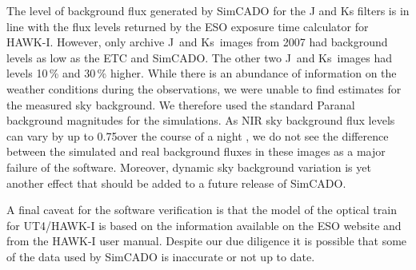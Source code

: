 The level of background flux generated by SimCADO for the J and Ks filters is in line with the flux levels returned by the ESO exposure time calculator for HAWK-I. However, only archive J~and Ks~images from 2007 had background levels as low as the ETC and SimCADO. The other two J~and Ks~images had levels 10\,\% and 30\,\% higher. While there is an abundance of information on the weather conditions during the observations, we were unable to find estimates for the measured sky background. We therefore used the standard Paranal background magnitudes for the simulations. As NIR sky background flux levels can vary by up to 0.75\m over the course of a night \citep{moreels08}, we do not see the difference between the simulated and real background fluxes in these images as a major failure of the software. Moreover, dynamic sky background variation is yet another effect that should be added to a future release of SimCADO.

A final caveat for the software verification is that the model of the optical train for UT4/HAWK-I is based on the information available on the ESO website and from the HAWK-I user manual. Despite our due diligence it is possible that some of the data used by SimCADO is inaccurate or not up to date. 

